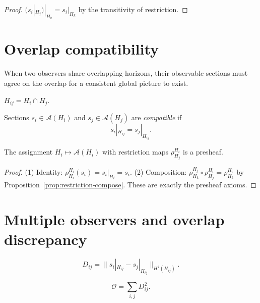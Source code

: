 \begin{proof}
  $(s_i|_{H_j})|_{H_k} = s_i|_{H_k}$ by the transitivity
  of restriction.
\end{proof}

\section{Overlap compatibility}

When two observers share overlapping horizons, their observable
sections must agree on the overlap for a consistent global
picture to exist.

\begin{definition}
  $H_{ij} = H_i \cap H_j$.
\end{definition}

\begin{definition}
  Sections $s_i \in \mathcal{A}(H_i)$ and
  $s_j \in \mathcal{A}(H_j)$ are \emph{compatible} if
  \[
    s_i|_{H_{ij}} = s_j|_{H_{ij}}.
  \]
\end{definition}

\begin{proposition}
  \label{prop:presheaf-horizons}
  \statusproven{}
  The assignment $H_i \mapsto \mathcal{A}(H_i)$ with
  restriction maps $\rho^{H_i}_{H_j}$ is a presheaf.
\end{proposition}

\begin{proof}
  (1) Identity: $\rho^{H_i}_{H_i}(s_i) = s_i|_{H_i} = s_i$.
  (2) Composition: $\rho^{H_j}_{H_k} \circ \rho^{H_i}_{H_j}
  = \rho^{H_i}_{H_k}$ by Proposition~\ref{prop:restriction-compose}.
  These are exactly the presheaf axioms.
\end{proof}

\section{Multiple observers and overlap discrepancy}

\begin{definition}
  \label{def:overlap-discrepancy}
  \[
    D_{ij} = \|s_i|_{H_{ij}} - s_j|_{H_{ij}}\|_{H^k(H_{ij})}.
  \]
\end{definition}

\begin{definition}
  \label{def:total-obstruction}
  \[
    \mathcal{O} = \sum_{i,j} D_{ij}^2.
  \]
\end{definition}

